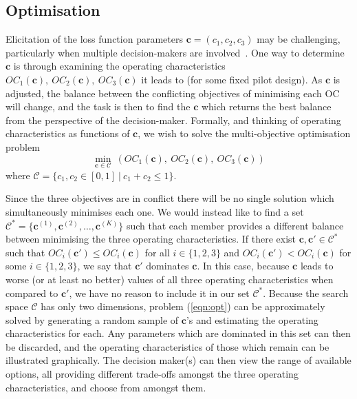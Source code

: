 \documentclass[AMA,STIX1COL]{WileyNJD-v2}
\begin{document}
\subsection{Optimisation}\label{sec:optimisation}

Elicitation of the loss function parameters $\mathbf{c} = (c_1, c_2, c_3)$ may be challenging, particularly when multiple decision-makers are involved~\cite{Keeney1976}. One way to determine $\mathbf{c}$ is through examining the operating characteristics $OC_{1}(\mathbf{c}),~ OC_{2}(\mathbf{c}),~ OC_{3}(\mathbf{c})$ it leads to (for some fixed pilot design). As $\mathbf{c}$ is adjusted, the balance between the conflicting objectives of minimising each OC will change, and the task is then to find the $\mathbf{c}$ which returns the best balance from the perspective of the decision-maker. Formally, and thinking of operating characteristics as functions of $\mathbf{c}$, we wish to solve the multi-objective optimisation problem
\begin{equation}\label{eqn:opt}
\min_{\mathbf{c} \in \mathcal{C}} ~ \left( OC_{1}(\mathbf{c}),~ OC_{2}(\mathbf{c}),~ OC_{3}(\mathbf{c}) \right)
\end{equation}
where $\mathcal{C} = \{c_{1}, c_{2} \in [0,1] ~|~ c_{1} + c_{2} \leq 1\}$. 

Since the three objectives are in conflict there will be no single solution which simultaneously minimises each one. We would instead like to find a set $\mathcal{C}^* = \{ \mathbf{c}^{(1)}, \mathbf{c}^{(2)}, \ldots, \mathbf{c}^{(K)} \}$ such that each member provides a different balance between minimising the three operating characteristics. If there exist $\mathbf{c}, \mathbf{c}' \in \mathcal{C}^*$ such that $OC_i(\mathbf{c}') \leq OC_i(\mathbf{c})$ for all $i \in \{1, 2, 3\}$ and $OC_i(\mathbf{c}') < OC_i(\mathbf{c})$ for some $i \in \{1, 2, 3\}$, we say that $\mathbf{c}'$ dominates $\mathbf{c}$. In this case, because $\mathbf{c}$ leads to worse (or at least no better) values of all three operating characteristics when compared to $\mathbf{c}'$, we have no reason to include it in our set $\mathcal{C}^*$. Because the search space $\mathcal{C}$ has only two dimensions, problem (\ref{eqn:opt}) can be approximately solved by generating a random sample of $\mathbf{c}$'s and estimating the operating characteristics for each. Any parameters which are dominated in this set can then be discarded, and the operating characteristics of those which remain can be illustrated graphically. The decision maker(s) can then view the range of available options, all providing different trade-offs amongst the three operating characteristics, and choose from amongst them. 
\end{document}
